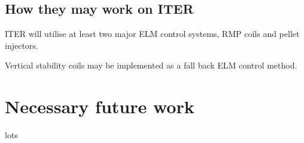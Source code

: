 \documentclass[12pt]{article}  %
\begin{document}
\subsection{How they may work on ITER}\label{ssec:onITER}
ITER will utilise at least two major ELM control systems, RMP coils and pellet injectors.\cite{Loarte2010}

Vertical stability coils may be implemented as a fall back ELM control method.\cite{Loarte2014a}

\section{Necessary future work}\label{sec:Future}
lots






\printbibliography
\end{document}
